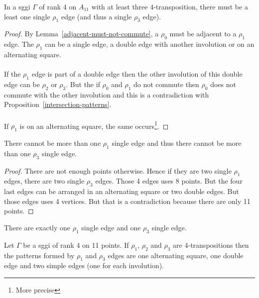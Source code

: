 \begin{lemma}
  In a sggi $\Gamma$ of rank 4 on $A_{11}$ with at least three 4-transposition, there must be a least one single $\rho_1$ edge (and thus a single $\rho_3$ edge).
\end{lemma}

\begin{proof}
  By Lemma~\ref{adjacent-must-not-commute}, a $\rho_0$ must be adjacent to a $\rho_1$ edge. The $\rho_1$ can be a single edge, a double edge with another involution or on an alternating square.

  \paragraph{}
  If the $\rho_1$ edge is part of a double edge then the other involution of this double edge can be $\rho_2$ or $\rho_3$. But the if $\rho_0$ and $\rho_1$ do not commute then $\rho_0$ does not commute with the other involution and this is a contradiction with Proposition~\ref{intersection-patterns}.

  \paragraph{}
  If $\rho_1$ is on an alternating square, the same occurs\footnote{More precise}.

\end{proof}

\begin{lemma}
  There cannot be more than one $\rho_1$ single edge and thus there cannot be more than one $\rho_3$ single edge.
\end{lemma}

\begin{proof}
  There are not enough points otherwise. Hence if they are two single $\rho_1$ edges, there are two single $\rho_3$ edges. Those 4 edges uses 8 points. But the four last edges can be arranged in an alternating square or two double edges. But those edges uses 4 vertices. But that is a contradiction because there are only 11 points.
\end{proof}

\begin{corollary}
  \label{rank-4-single-1}
  There are exactly one $\rho_1$ single edge and one $\rho_3$ single edge.
\end{corollary}

\begin{lemma}
  \label{rank-4-3-patterns}
  Let $\Gamma$ be a sggi of rank 4 on 11 points. If $\rho_1$, $\rho_2$ and $\rho_3$ are 4-transpositions then the patterns formed by $\rho_1$ and $\rho_3$ edges are one alternating square, one double edge and two simple edges (one for each involution).
\end{lemma}

